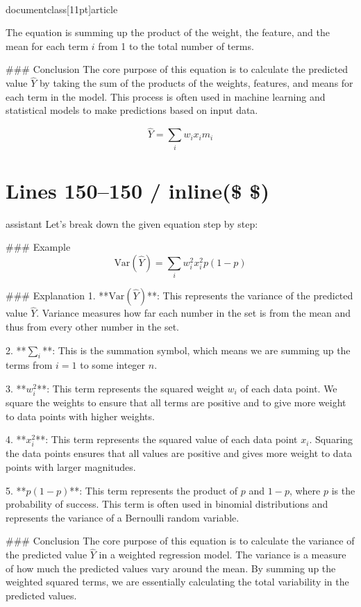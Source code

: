 \\documentclass[11pt]{article}
\begin{document}
The equation is summing up the product of the weight, the feature, and the mean for each term \(i\) from 1 to the total number of terms.

### Conclusion
The core purpose of this equation is to calculate the predicted value \(\hat{Y}\) by taking the sum of the products of the weights, features, and means for each term in the model. This process is often used in machine learning and statistical models to make predictions based on input data.

\[
\boxed{\hat{Y} = \sum_i w_i x_i m_i}
\]


\section*{Lines 150–150 / inline(\$ \$) }
assistant
Let's break down the given equation step by step:

### Example
\[
\text{Var}(\hat{Y}) = \sum_i w_i^2 x_i^2 p(1-p)
\]

### Explanation
1. **\(\text{Var}(\hat{Y})\)**: This represents the variance of the predicted value \(\hat{Y}\). Variance measures how far each number in the set is from the mean and thus from every other number in the set.

2. **\(\sum_i\)**: This is the summation symbol, which means we are summing up the terms from \(i = 1\) to some integer \(n\).

3. **\(w_i^2\)**: This term represents the squared weight \(w_i\) of each data point. We square the weights to ensure that all terms are positive and to give more weight to data points with higher weights.

4. **\(x_i^2\)**: This term represents the squared value of each data point \(x_i\). Squaring the data points ensures that all values are positive and gives more weight to data points with larger magnitudes.

5. **\(p(1-p)\)**: This term represents the product of \(p\) and \(1-p\), where \(p\) is the probability of success. This term is often used in binomial distributions and represents the variance of a Bernoulli random variable.

### Conclusion
The core purpose of this equation is to calculate the variance of the predicted value \(\hat{Y}\) in a weighted regression model. The variance is a measure of how much the predicted values vary around the mean. By summing up the weighted squared terms, we are essentially calculating the total variability in the predicted values.
\end{document}
